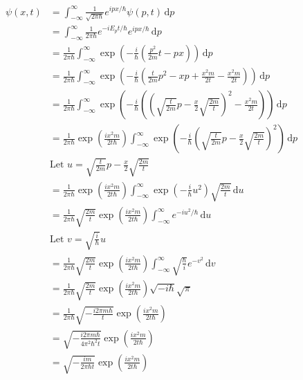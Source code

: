 \documentclass[11pt, letterpaper]{article}
\begin{document}
\begin{enumerate}
\begin{align*}
			\psi (x,t)&=\int_{-\infty }^{\infty } \frac{1}{\sqrt{2\pi \hbar } } e^{ipx/\hbar } \psi (p,t) \,\mathrm{d} p\\
				  &=\int_{-\infty }^{\infty } \frac{1}{2\pi \hbar } e^{-iE_pt/\hbar } e^{ipx/\hbar }  \,\mathrm{d} p\\
				  &=\frac{1}{2\pi \hbar } \int_{-\infty }^{\infty } \exp \left( -\frac{i}{\hbar } \left( \frac{p^2}{2m}t-px  \right)  \right)  \,\mathrm{d} p\\
				  &=\frac{1}{2\pi \hbar } \int_{-\infty }^{\infty } \exp \left( -\frac{i}{\hbar } \left( \frac{t}{2m} p^2-xp+\frac{x^2m}{2t} -\frac{x^2m}{2t}  \right)  \right)  \,\mathrm{d} p\\
				  &=\frac{1}{2\pi \hbar } \int_{-\infty }^{\infty } \exp \left( -\frac{i}{\hbar } \left( \left( \sqrt{\frac{t}{2m}} p-\frac{x}{2} \sqrt{\frac{2m}{t} }  \right) ^2-\frac{x^2m}{2t}  \right)  \right)  \,\mathrm{d} p\\
				  &=\frac{1}{2\pi \hbar } \exp \left( \frac{ix^2m}{2t\hbar }  \right) \int_{-\infty }^{\infty } \exp \left( -\frac{i}{\hbar } \left( \sqrt{\frac{t}{2m}} p-\frac{x}{2} \sqrt{\frac{2m}{t} }   \right) ^2 \right)  \,\mathrm{d} p\\
				  &\text{Let } u=\sqrt{\frac{t}{2m} } p-\frac{x}{2} \sqrt{\frac{2m}{t} } \\
				  &=\frac{1}{2\pi \hbar } \exp \left( \frac{ix^2m}{2t\hbar }  \right) \int_{-\infty }^{\infty } \exp \left( -\frac{i}{\hbar } u^2 \right) \sqrt{\frac{2m}{t} }  \,\mathrm{d} u\\
				  &=\frac{1}{2\pi \hbar } \sqrt{\frac{2m}{t} } \exp \left( \frac{ix^2m}{2t\hbar }  \right) \int_{-\infty }^{\infty } e^{-iu^2/\hbar }  \,\mathrm{d} u\\
				  &\text{Let } v=\sqrt{\frac{i}{\hbar } } u\\
				  &=\frac{1}{2\pi \hbar } \sqrt{\frac{2m}{t} } \exp \left( \frac{ix^2m}{2t\hbar }  \right) \int_{-\infty }^{\infty } \sqrt{\frac{\hbar }{i} } e^{-v^2}  \,\mathrm{d} v\\
				  &=\frac{1}{2\pi \hbar } \sqrt{\frac{2m}{t} } \exp \left( \frac{ix^2m}{2t\hbar }  \right) \sqrt{-i\hbar } \sqrt{\pi } \\
				  &=\frac{1}{2\pi \hbar } \sqrt{-\frac{i2\pi m\hbar }{t} } \exp \left( \frac{ix^2m}{2t\hbar }  \right) \\
				  &=\sqrt{-\frac{i2\pi m\hbar }{4\pi ^2\hbar ^2t} } \exp \left( \frac{ix^2m}{2t\hbar }  \right) \\
				  &=\sqrt{-\frac{i m}{2\pi \hbar t} } \exp \left( \frac{ix^2m}{2t\hbar }  \right) 

\end{align*}
\end{enumerate}
\end{document}

